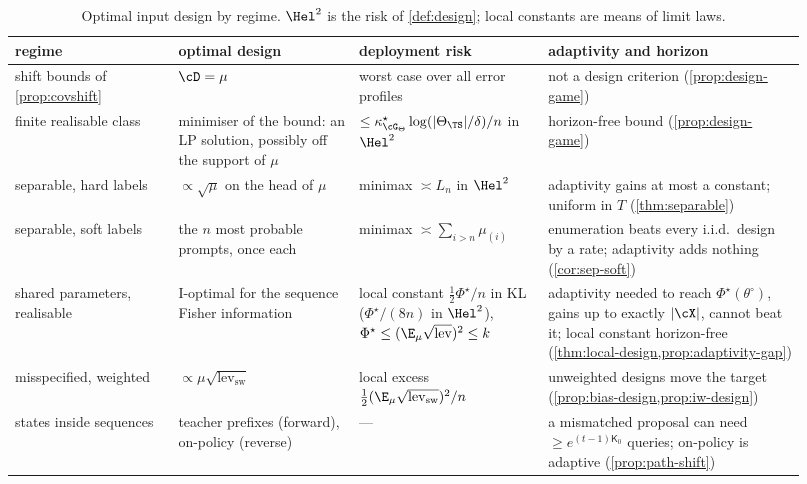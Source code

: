 \begin{table}[tbp]\centering\small
\begin{tabular}{@{}>{\raggedright\arraybackslash}p{0.19\linewidth}>{\raggedright\arraybackslash}p{0.21\linewidth}>{\raggedright\arraybackslash}p{0.22\linewidth}>{\raggedright\arraybackslash}p{0.3\linewidth}@{}}
\toprule
regime & optimal design & deployment risk & adaptivity and horizon\\\midrule
shift bounds of \cref{prop:covshift} & $\cD=\mu$ & worst case over all error profiles & not a design criterion (\cref{prop:design-game})\\\addlinespace[2pt]
finite realisable class & minimiser of the bound: an LP solution, possibly off the support of $\mu$ & $\le\kappa^\star_{\cG_\Theta}\log(|\Theta_\TS|/\delta)/n$ in $\Hel^2$ & horizon-free bound (\cref{prop:design-game})\\\addlinespace[2pt]
separable, hard labels & $\propto\sqrt\mu$ on the head of $\mu$ & minimax $\asymp L_n$ in $\Hel^2$ & adaptivity gains at most a constant; uniform in $T$ (\cref{thm:separable})\\\addlinespace[2pt]
separable, soft labels & the $n$ most probable prompts, once each & minimax $\asymp\sum_{i>n}\mu_{(i)}$ & enumeration beats every i.i.d.\ design by a rate; adaptivity adds nothing (\cref{cor:sep-soft})\\\addlinespace[2pt]
shared parameters, realisable & I-optimal for the sequence Fisher information & local constant $\frac12\Phi^\star/n$ in KL ($\Phi^\star/(8n)$ in $\Hel^2$), $\Phi^\star\le(\E_\mu\sqrt{\mathrm{lev}})^2\le k$ & adaptivity needed to reach $\Phi^\star(\theta^\circ)$, gains up to exactly $|\cX|$, cannot beat it; local constant horizon-free (\cref{thm:local-design,prop:adaptivity-gap})\\\addlinespace[2pt]
misspecified, weighted & $\propto\mu\sqrt{\mathrm{lev}_{\mathrm{sw}}}$ & local excess $\frac12(\E_\mu\sqrt{\mathrm{lev}_{\mathrm{sw}}})^2/n$ & unweighted designs move the target (\cref{prop:bias-design,prop:iw-design})\\\addlinespace[2pt]
states inside sequences & teacher prefixes (forward), on-policy (reverse) & --- & a mismatched proposal can need $\ge e^{(t-1)\mathsf K_0}$ queries; on-policy is adaptive (\cref{prop:path-shift})\\\bottomrule
\end{tabular}
\caption{Optimal input design by regime. $\Hel^2$ is the risk of \cref{def:design}; local constants are
means of limit laws.}\label{tab:design}
\end{table}

